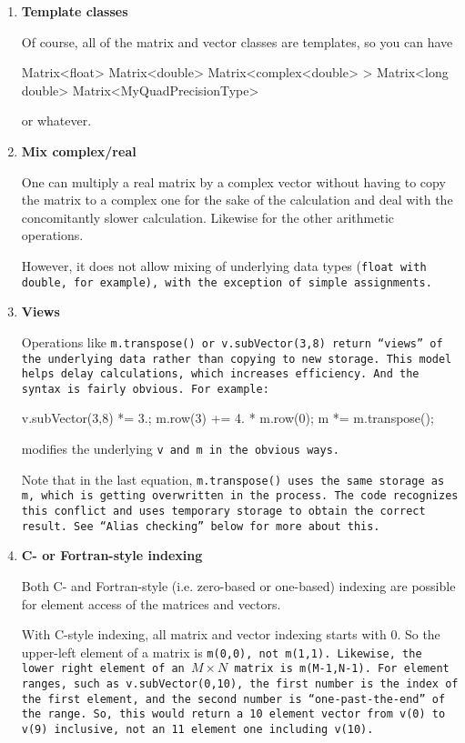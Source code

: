 \begin{enumerate}
\item
\textbf{Template classes}

Of course, all of the matrix and vector classes are templates, so you can have 
\begin{tmvcode}
Matrix<float>
Matrix<double>
Matrix<complex<double> >
Matrix<long double>
Matrix<MyQuadPrecisionType>
\end{tmvcode}
or whatever.

\item
\textbf{Mix complex/real}

One can multiply a real matrix by a complex
vector without having to copy the matrix to a complex one for the sake of the calculation
and deal with the concomitantly slower calculation.  
Likewise for the other arithmetic operations.  

However, it does not allow mixing of underlying data types 
(\tt{float} with \tt{double}, for example), 
with the exception of simple assignments.

\item
\textbf{Views}

Operations like \tt{m.transpose()} or \tt{v.subVector(3,8)}
return ``views'' of the underlying data rather than copying to new storage.  
This model helps delay calculations, which increases efficiency.  And the syntax
is fairly obvious.  For example:
\begin{tmvcode}
v.subVector(3,8) *= 3.;
m.row(3) += 4. * m.row(0);
m *= m.transpose();
\end{tmvcode}
modifies the underlying \tt{v} and \tt{m} in the obvious ways.

Note that in the last equation, \tt{m.transpose()} uses the same storage as
\tt{m}, which is getting overwritten in the process.  The code recognizes 
this conflict and uses temporary storage to obtain the correct result.
See ``Alias checking'' below for more about this.

\item
\textbf{C- or Fortran-style indexing}

Both C- and Fortran-style (i.e. zero-based or one-based) indexing are possible for
element access of the matrices and vectors.

With C-style indexing, all matrix and vector indexing starts with 0.  
So the upper-left element of a matrix is \tt{m(0,0)}, not \tt{m(1,1)}. 
Likewise, the lower right element of an $M \times N$ matrix is \tt{m(M-1,N-1)}.
For element ranges, such as \tt{v.subVector(0,10)}, the first number is the 
index of the first element, and the second number is ``one-past-the-end'' of 
the range.  So, this would return a 10 element vector from \tt{v(0)} to
\tt{v(9)} inclusive, not an 11 element one including \tt{v(10)}.


\end{enumerate}
